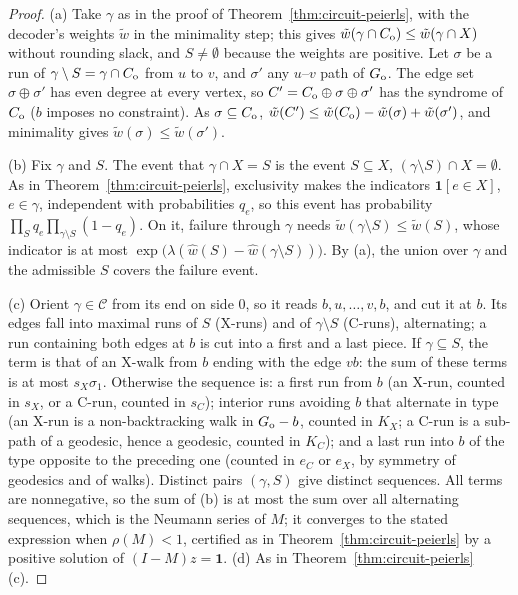 \begin{proof}
(a) Take $\gamma$ as in the proof of Theorem~\ref{thm:circuit-peierls}, with the decoder's weights $\tilde w$ in the minimality step; this gives $\tilde w(\gamma\cap C_{\rm o})\le\tilde w(\gamma\cap X)$ without rounding slack, and $S\neq\emptyset$ because the weights are positive. Let $\sigma$ be a run of $\gamma\setminus S=\gamma\cap C_{\rm o}$ from $u$ to $v$, and $\sigma'$ any $u$--$v$ path of $G_{\rm o}$. The edge set $\sigma\oplus\sigma'$ has even degree at every vertex, so $C'=C_{\rm o}\oplus\sigma\oplus\sigma'$ has the syndrome of $C_{\rm o}$ ($b$ imposes no constraint). As $\sigma\subseteq C_{\rm o}$, $\tilde w(C')\le\tilde w(C_{\rm o})-\tilde w(\sigma)+\tilde w(\sigma')$, and minimality gives $\tilde w(\sigma)\le\tilde w(\sigma')$.

(b) Fix $\gamma$ and $S$. The event that $\gamma\cap X=S$ is the event $S\subseteq X$, $(\gamma\setminus S)\cap X=\emptyset$. As in Theorem~\ref{thm:circuit-peierls}, exclusivity makes the indicators $\mathbf 1[e\in X]$, $e\in\gamma$, independent with probabilities $q_e$, so this event has probability $\prod_{S}q_e\prod_{\gamma\setminus S}(1-q_e)$. On it, failure through $\gamma$ needs $\tilde w(\gamma\setminus S)\le\tilde w(S)$, whose indicator is at most $\exp\big(\lambda(\hat w(S)-\hat w(\gamma\setminus S))\big)$. By (a), the union over $\gamma$ and the admissible $S$ covers the failure event.

(c) Orient $\gamma\in\mathcal C$ from its end on side $0$, so it reads $b,u,\dots,v,b$, and cut it at $b$. Its edges fall into maximal runs of $S$ (X-runs) and of $\gamma\setminus S$ (C-runs), alternating; a run containing both edges at $b$ is cut into a first and a last piece. If $\gamma\subseteq S$, the term is that of an X-walk from $b$ ending with the edge $vb$: the sum of these terms is at most $s_X\sigma_1$. Otherwise the sequence is: a first run from $b$ (an X-run, counted in $s_X$, or a C-run, counted in $s_C$); interior runs avoiding $b$ that alternate in type (an X-run is a non-backtracking walk in $G_{\rm o}-b$, counted in $K_X$; a C-run is a sub-path of a geodesic, hence a geodesic, counted in $K_C$); and a last run into $b$ of the type opposite to the preceding one (counted in $e_C$ or $e_X$, by symmetry of geodesics and of walks). Distinct pairs $(\gamma,S)$ give distinct sequences. All terms are nonnegative, so the sum of (b) is at most the sum over all alternating sequences, which is the Neumann series of $M$; it converges to the stated expression when $\rho(M)<1$, certified as in Theorem~\ref{thm:circuit-peierls} by a positive solution of $(I-M)z=\mathbf 1$.
(d) As in Theorem~\ref{thm:circuit-peierls}(c).
\end{proof}

